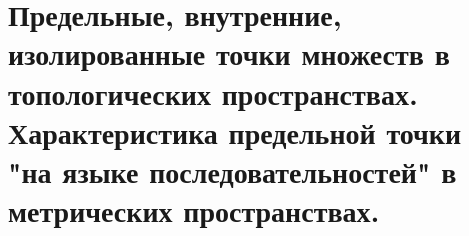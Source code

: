 \documentclass[../main.tex]{subfiles}
\begin{document}
\newpage
\section{Предельные, внутренние, изолированные точки множеств в топологических пространствах. Характеристика предельной точки "на языке последовательностей" в метрических пространствах.}
\end{document}
